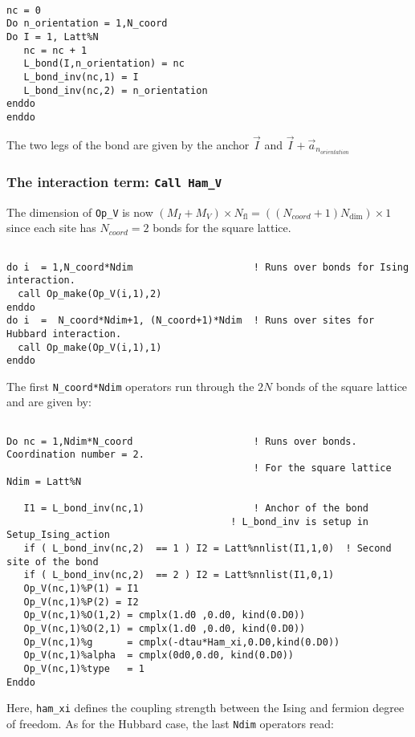 \begin{lstlisting}

nc = 0
Do n_orientation = 1,N_coord
Do I = 1, Latt%N
   nc = nc + 1
   L_bond(I,n_orientation) = nc
   L_bond_inv(nc,1) = I    
   L_bond_inv(nc,2) = n_orientation
enddo
enddo
\end{lstlisting}
The two legs of the bond are given by  the anchor $\vec{I}$ and $\vec{I}+ \vec{a}_{n_{orientation}}$
\subsubsection{The interaction term: \texttt{Call Ham\_V}}

The dimension of   \texttt{Op\_V}  is now  $(M_I + M_V)\times N_{\mathrm{fl}}=((N_{coord} +  1 )N_{\mathrm{dim}}) \times 1$ since each site has $N_{coord} =2$ bonds   for the square lattice.



\begin{lstlisting}

do i  = 1,N_coord*Ndim                     ! Runs over bonds for Ising interaction.
  call Op_make(Op_V(i,1),2)
enddo
do i  =  N_coord*Ndim+1, (N_coord+1)*Ndim  ! Runs over sites for Hubbard interaction.
  call Op_make(Op_V(i,1),1)
enddo

\end{lstlisting}

The  first  \texttt{N\_coord*Ndim} operators run through the $2N$ bonds of the square lattice and   are given by:
\begin{lstlisting}

Do nc = 1,Ndim*N_coord                     ! Runs over bonds. Coordination number = 2.
                                           ! For the square lattice Ndim = Latt%N
  
   I1 = L_bond_inv(nc,1)                   ! Anchor of the bond
	                                   ! L_bond_inv is setup in Setup_Ising_action
   if ( L_bond_inv(nc,2)  == 1 ) I2 = Latt%nnlist(I1,1,0)  ! Second site of the bond 
   if ( L_bond_inv(nc,2)  == 2 ) I2 = Latt%nnlist(I1,0,1) 
   Op_V(nc,1)%P(1) = I1
   Op_V(nc,1)%P(2) = I2
   Op_V(nc,1)%O(1,2) = cmplx(1.d0 ,0.d0, kind(0.D0))
   Op_V(nc,1)%O(2,1) = cmplx(1.d0 ,0.d0, kind(0.D0))
   Op_V(nc,1)%g      = cmplx(-dtau*Ham_xi,0.D0,kind(0.D0))
   Op_V(nc,1)%alpha  = cmplx(0d0,0.d0, kind(0.D0))
   Op_V(nc,1)%type   = 1
Enddo

\end{lstlisting}
Here,  \texttt{ham\_xi} defines the coupling strength  between the Ising  and fermion degree of freedom.
As for the Hubbard case, the last \texttt{Ndim}  operators read: 

